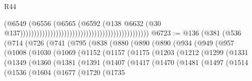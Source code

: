 \begin{lexlean}{R44}
\begin{coremodule}
{                                                                                      (@6549
                                                                                        (@6556
                                                                                          (@6565
                                                                                            (@6592
                                                                                              (@138
                                                                                                @6632
                                                                                                (@30
                                                                                                  @137)))))))))))))))))))))))))))))))))))))))))))))))
@6723 := @136
    (@381
      (@536
        (@714
          (@726
            (@741
              (@795
                (@838
                  (@880
                    (@890
                      (@890
                        (@934
                          (@949
                            (@957
                              (@1008
                                (@1030
                                  (@1069
                                    (@1152
                                      (@1157
                                        (@1175
                                          (@1203
                                            (@1212
                                              (@1299
                                                (@1331
                                                  (@1349
                                                    (@1360
                                                      (@1381
                                                        (@1391
                                                          (@1407
                                                            (@1417
                                                              (@1470
                                                                (@1481
                                                                  (@1497
                                                                    (@1514
                                                                      (@1536
                                                                        (@1604
                                                                          (@1677
                                                                            (@1720
                                                                              (@1735
}
\end{coremodule}
\end{lexlean}
